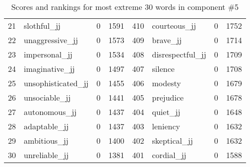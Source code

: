 \begin{table}[tbp]
\begin{tabular}{| rlr@{.}l | rlr@{.}l |}
    21 & slothful\_jj & 0 & 1591    &    410 & courteous\_jj & 0 & 1752 \\
    22 & unaggressive\_jj & 0 & 1573    &    409 & brave\_jj & 0 & 1714 \\
    23 & impersonal\_jj & 0 & 1534    &    408 & disrespectful\_jj & 0 & 1709 \\
    24 & imaginative\_jj & 0 & 1497    &    407 & silence & 0 & 1708 \\
    25 & unsophisticated\_jj & 0 & 1455    &    406 & modesty & 0 & 1679 \\
    26 & unsociable\_jj & 0 & 1441    &    405 & prejudice & 0 & 1678 \\
    27 & autonomous\_jj & 0 & 1437    &    404 & quiet\_jj & 0 & 1648 \\
    28 & adaptable\_jj & 0 & 1437    &    403 & leniency & 0 & 1632 \\
    29 & ambitious\_jj & 0 & 1400    &    402 & skeptical\_jj & 0 & 1632 \\
    30 & unreliable\_jj & 0 & 1381    &    401 & cordial\_jj & 0 & 1588 \\
    \hline
    \end{tabular}
    \caption{Scores and rankings for most extreme 30 words in component \#5} 
\end{table}
\clearpage
